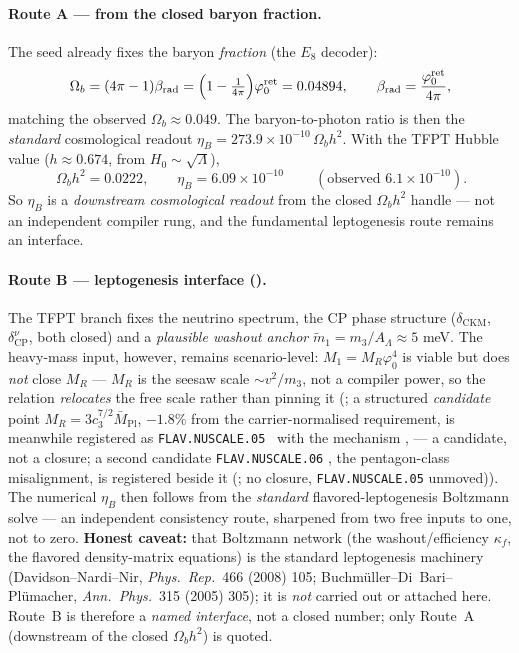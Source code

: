 \paragraph{Route A --- from the closed baryon fraction.} The seed already fixes the baryon
\emph{fraction} (the $E_8$ decoder):
\[
  \Omega_b=(4\pi-1)\beta_{\mathrm{rad}}=\Bigl(1-\tfrac1{4\pi}\Bigr)\varphi_0^{\mathrm{ret}}=0.04894 ,\qquad
  \beta_{\mathrm{rad}}=\frac{\varphi_0^{\mathrm{ret}}}{4\pi},
\]
matching the observed $\Omega_b\approx0.049$. The baryon-to-photon ratio is then the \emph{standard}
cosmological readout $\eta_B=273.9\times10^{-10}\,\Omega_b h^2$. With the TFPT Hubble value
($h\approx0.674$, from $H_0\sim\sqrt\Lambda$),
\[
  \boxed{\ \Omega_b h^2=0.0222,\qquad \eta_B=6.09\times10^{-10}\ }\qquad(\text{observed }6.1\times10^{-10}).
\]
So $\eta_B$ is a \emph{downstream cosmological readout} from the closed $\Omega_b h^2$ handle --- not an
independent compiler rung, and the fundamental leptogenesis route remains an interface.

\paragraph{Route B --- leptogenesis interface (\mC).} The TFPT branch fixes the neutrino
spectrum, the CP phase structure ($\delta_{\mathrm{CKM}}$, $\delta^\nu_{\mathrm{CP}}$, both closed) and a
\emph{plausible washout anchor} $\tilde m_1=m_3/A_\Lambda\approx5$ meV. The heavy-mass input, however,
remains scenario-level: $M_1=M_R\varphi_0^4$ is viable but does \emph{not} close $M_R$ --- $M_R$ is the
seesaw scale $\sim v^2/m_3$, not a compiler power, so the relation \emph{relocates} the free scale rather
than pinning it (; a structured \emph{candidate} point
$M_R=3c_3^{7/2}\bar M_{\mathrm{Pl}}$, $-1.8\%$ from the carrier-normalised requirement, is meanwhile registered as
\texttt{FLAV.NUSCALE.05} \mC\ with the mechanism \mO,  --- a candidate,
not a closure; a second candidate \texttt{FLAV.NUSCALE.06} \mC, the pentagon-class
misalignment, is registered beside it
(; no closure,
\texttt{FLAV.NUSCALE.05} unmoved)). The numerical $\eta_B$ then follows from the
\emph{standard} flavored-leptogenesis Boltzmann solve --- an independent consistency route, sharpened from
two free inputs to one, not to zero. \textbf{Honest caveat:} that Boltzmann network (the
washout/efficiency $\kappa_f$, the flavored density-matrix equations) is the standard leptogenesis
machinery (Davidson--Nardi--Nir, \emph{Phys.\ Rep.}\ 466 (2008) 105; Buchm\"uller--Di~Bari--Pl\"umacher,
\emph{Ann.\ Phys.}\ 315 (2005) 305); it is \emph{not} carried out or attached here. Route~B is therefore a
\emph{named interface}, not a closed number; only Route~A (downstream of the closed $\Omega_b h^2$) is
quoted.


